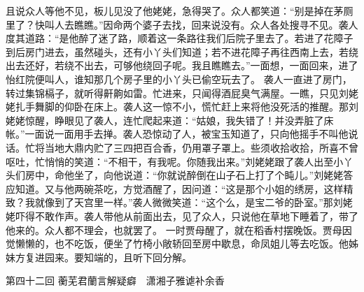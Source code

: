 \documentclass[12pt,oneside]{book}
\begin{document}
且说众人等他不见，板儿见没了他姥姥，急得哭了。众人都笑道：“别是掉在茅厕里了？快叫人去瞧瞧。”因命两个婆子去找，回来说没有。众人各处搜寻不见。袭人度其道路：“是他醉了迷了路，顺着这一条路往我们后院子里去了。若进了花障子到后房门进去，虽然碰头，还有小丫头们知道；若不进花障子再往西南上去，若绕出去还好，若绕不出去，可够他绕回子呢。我且瞧瞧去。”一面想，一面回来，进了怡红院便叫人，谁知那几个房子里的小丫头已偷空玩去了。
袭人一直进了房门，转过集锦槅子，就听得鼾齁如雷。忙进来，只闻得酒屁臭气满屋。一瞧，只见刘姥姥扎手舞脚的仰卧在床上。袭人这一惊不小，慌忙赶上来将他没死活的推醒。那刘姥姥惊醒，睁眼见了袭人，连忙爬起来道：“姑娘，我失错了！并没弄脏了床帐。”一面说一面用手去掸。袭人恐惊动了人，被宝玉知道了，只向他摇手不叫他说话。忙将当地大鼎内贮了三四把百合香，仍用罩子罩上。些须收拾收拾，所喜不曾呕吐，忙悄悄的笑道：“不相干，有我呢。你随我出来。”刘姥姥跟了袭人出至小丫头们房中，命他坐了，向他说道：“你就说醉倒在山子石上打了个盹儿。”刘姥姥答应知道。又与他两碗茶吃，方觉酒醒了，因问道：“这是那个小姐的绣房，这样精致？我就像到了天宫里一样。”袭人微微笑道：“这个么，是宝二爷的卧室。”那刘姥姥吓得不敢作声。袭人带他从前面出去，见了众人，只说他在草地下睡着了，带了他来的。众人都不理会，也就罢了。
一时贾母醒了，就在稻香村摆晚饭。贾母因觉懒懒的，也不吃饭，便坐了竹椅小敞轿回至房中歇息，命凤姐儿等去吃饭。他姊妹方复进园来。要知端的，且听下回分解。

 
第四十二回  蘅芜君蘭言解疑癖　潇湘子雅谑补余香
\end{document}
